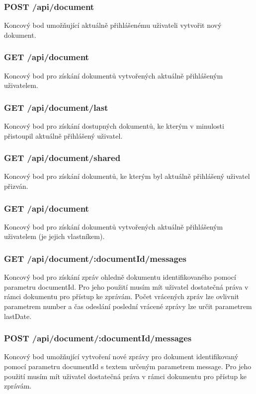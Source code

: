 \subsubsection{POST /api/document}

Koncový bod umožňující aktuálně přihlášenému uživateli vytvořit nový dokument.

\subsubsection{GET /api/document}

Koncový bod pro získání dokumentů vytvořených aktuálně přihlášeným uživatelem.

\subsubsection{GET /api/document/last}

Koncový bod pro získání dostupných dokumentů, ke kterým v minulosti přistoupil aktuálně přihlášený uživatel.

\subsubsection{GET /api/document/shared}

Koncový bod pro získání dokumentů, ke kterým byl aktuálně přihlášený uživatel přizván.

\subsubsection{GET /api/document}

Koncový bod pro získání dokumentů vytvořených aktuálně přihlášeným uživatelem (je jejich vlastníkem).

\subsubsection{GET /api/document/:documentId/messages}

Koncový bod pro získání zpráv ohledně dokumentu identifikovaného pomocí parametru documentId.
Pro jeho použití musím mít uživatel dostatečná práva v rámci dokumentu pro přístup ke zprávám.
Počet vrácených zpráv lze ovlivnit parametrem number a čas odeslání poslední vrácené zprávy lze určit parametrem lastDate.

\subsubsection{POST /api/document/:documentId/messages}
Koncový bod umožňující vytvoření nové zprávy pro dokument identifikovaný pomocí parametru documentId s textem určeným parametrem message.
Pro jeho použití musím mít uživatel dostatečná práva v rámci dokumentu pro přístup ke zprávám.

